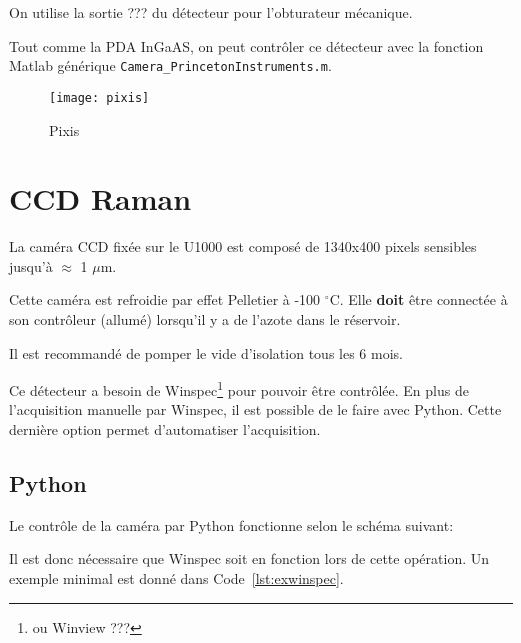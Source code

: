 \documentclass[11pt,francais]{book} %
\begin{document}
On utilise la sortie ??? du détecteur pour l'obturateur mécanique.

Tout comme la PDA InGaAS, on peut contrôler ce détecteur avec la fonction Matlab générique \verb!Camera_PrincetonInstruments.m!.

\begin{figure}[h]
  \centering\texttt{[image: pixis]}
  \caption{Pixis}
  \label{fig:pixis}
\end{figure}



\section{CCD Raman}

La caméra CCD fixée sur le U1000 est composé de 1340x400 pixels sensibles jusqu'à $\approx$ 1 $\mu$m.

Cette caméra est refroidie par effet Pelletier à -100 $^{\circ}$C.
Elle {\bf doit} être connectée à son contrôleur (allumé) lorsqu'il y a de l'azote dans le réservoir.

Il est recommandé de pomper le vide d'isolation tous les 6 mois.

Ce détecteur a besoin de Winspec\footnote{ou Winview ???} pour pouvoir être contrôlée.
En plus de l'acquisition manuelle par Winspec, il est possible de le faire avec Python.
Cette dernière option permet d'automatiser l'acquisition.

\subsection{Python}

Le contrôle de la caméra par Python fonctionne selon le schéma suivant: 
\begin{center}
\end{center}

Il est donc nécessaire que Winspec soit en fonction lors de cette opération.
Un exemple minimal est donné dans Code~\ref{lst:exwinspec}.
\end{document}

